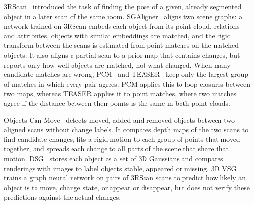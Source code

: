 \documentclass[11pt, a4paper]{article}
\begin{document}
3RScan~\cite{wald2019rio} introduced the task of finding the pose of a given, already segmented object in a later scan of the same room. SGAligner~\cite{sarkar2023sgaligner} aligns two scene graphs: a network trained on 3RScan embeds each object from its point cloud, relations and attributes, objects with similar embeddings are matched, and the rigid transform between the scans is estimated from point matches on the matched objects. It also aligns a partial scan to a prior map that contains changes, but reports only how well objects are matched, not what changed. When many candidate matches are wrong, PCM~\cite{mangelson2018pcm} and TEASER~\cite{yang2021teaser} keep only the largest group of matches in which every pair agrees. PCM applies this to loop closures between two maps, whereas TEASER applies it to point matches, where two matches agree if the distance between their points is the same in both point clouds.

Objects Can Move~\cite{adam2022objects} detects moved, added and removed objects between two aligned scans without change labels. It compares depth maps of the two scans to find candidate changes, fits a rigid motion to each group of points that moved together, and spreads each change to all parts of the scene that share that motion. DSG~\cite{dsg2026dynamic} stores each object as a set of 3D Gaussians and compares renderings with images to label objects stable, appeared or missing. 3D VSG~\cite{looper2023vsg} trains a graph neural network on pairs of 3RScan scans to predict how likely an object is to move, change state, or appear or disappear, but does not verify these predictions against the actual changes.
\end{document}
